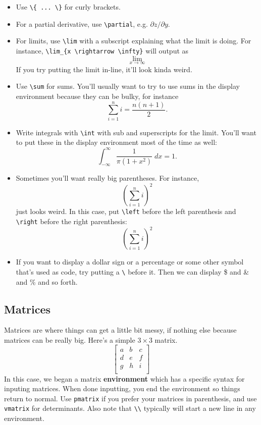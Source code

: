 \documentclass[12pt]{article}
\begin{document}
\begin{itemize}
		\item Use \verb|\{ ... \}| for curly brackets. 
		
\item For a partial derivative, use \verb|\partial|, e.g. $\partial z/\partial
y$.
		
\item For limits, use \verb|\lim| with a subscript explaining what the limit is
doing. For instance, \verb|\lim_{x \rightarrow \infty}| will output as
				\[ \lim_{x \rightarrow \infty}  \]
		If you try putting the limit in-line, it'll look kinda weird. 
		
\item Use \verb|\sum| for sums. You'll usually want to try to use sums in the
display environment because they can be bulky, for instance
			\[\sum_{i=1}^n i = \frac{n(n+1)}{2}.\]
			
\item Write integrals with \verb|\int| with sub and superscripts for the limit.
You'll want to put these in the display environment most of the time as well:
			\[ \int_{-\infty}^{\infty} \frac{1}{\pi(1+x^2)} \; dx = 1 .\]
			
		\item Sometimes you'll want really big parentheses. For instance,
				\[ ( \sum_{i=1}^n i)^2	\]
just looks weird. In this case, put \verb|\left| before the left parenthesis and
\verb|\right| before the right parenthesis:
				\[ \left( \sum_{i=1}^n i \right)^2	\]
				
\item If you want to display a dollar sign or a percentage or some other symbol
that's used as code, try putting a \verb|\| before it. Then we can display \$
and \& and \% and so forth.
	\end{itemize}
	
	
\subsection{Matrices}

Matrices are where things can get a little bit messy, if nothing else because
matrices can be really big. Here's a simple $3 \times 3$ matrix.
\[
	\begin{bmatrix}
		a	&	b	&	c	\\
		d	&	e	&	f	\\
		g	&	h	&	i	\\
	\end{bmatrix}
\]
In this case, we began a matrix \textbf{environment} which has a specific syntax
for inputing matrices. When done inputting, you end the environment so things
return to normal. Use \verb|pmatrix| if you prefer your matrices in parenthesis,
and use \verb|vmatrix| for determinants. Also note that \verb|\\| typically will
start a new line in any environment.
\end{document}

